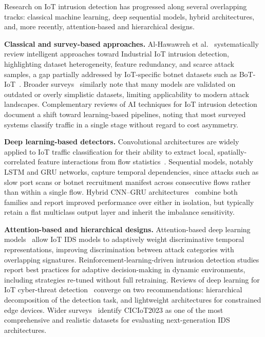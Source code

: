 \documentclass{llncs}
\begin{document}
Research on IoT intrusion detection has progressed along several overlapping tracks: classical machine learning, deep sequential models, hybrid architectures, and, more recently, attention-based and hierarchical designs.

\textbf{Classical and survey-based approaches.} Al-Hawawreh et al.~\cite{ref1} systematically review intelligent approaches toward Industrial IoT intrusion detection, highlighting dataset heterogeneity, feature redundancy, and scarce attack samples, a gap partially addressed by IoT-specific botnet datasets such as BoT-IoT~\cite{ref19}. Broader surveys~\cite{ref2} similarly note that many models are validated on outdated or overly simplistic datasets, limiting applicability to modern attack landscapes. Complementary reviews of AI techniques for IoT intrusion detection~\cite{ref3} document a shift toward learning-based pipelines, noting that most surveyed systems classify traffic in a single stage without regard to cost asymmetry.

\textbf{Deep learning-based detectors.} Convolutional architectures are widely applied to IoT traffic classification for their ability to extract local, spatially-correlated feature interactions from flow statistics~\cite{ref4}. Sequential models, notably LSTM and GRU networks, capture temporal dependencies, since attacks such as slow port scans or botnet recruitment manifest across consecutive flows rather than within a single flow. Hybrid CNN--GRU architectures~\cite{ref5} combine both families and report improved performance over either in isolation, but typically retain a flat multiclass output layer and inherit the imbalance sensitivity.

\textbf{Attention-based and hierarchical designs.} Attention-based deep learning models~\cite{ref6} allow IoT IDS models to adaptively weight discriminative temporal representations, improving discrimination between attack categories with overlapping signatures. Reinforcement-learning-driven intrusion detection studies~\cite{ref7} report best practices for adaptive decision-making in dynamic environments, including strategies re-tuned without full retraining. Reviews of deep learning for IoT cyber-threat detection~\cite{ref4} converge on two recommendations: hierarchical decomposition of the detection task, and lightweight architectures for constrained edge devices. Wider surveys~\cite{ref9,ref10} identify CICIoT2023 as one of the most comprehensive and realistic datasets for evaluating next-generation IDS architectures.
\end{document}
